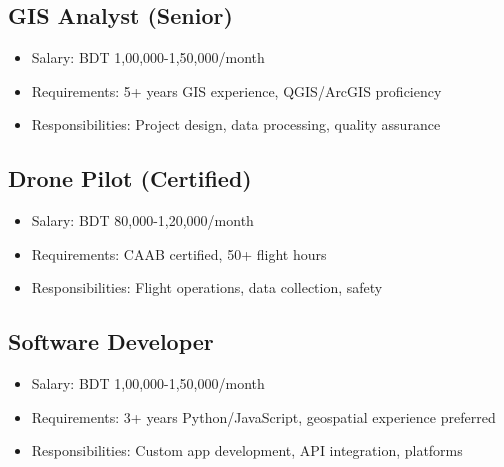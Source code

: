 \subsection*{GIS Analyst (Senior)}

\begin{itemize}
    \item Salary: BDT 1,00,000-1,50,000/month
    \item Requirements: 5+ years GIS experience, QGIS/ArcGIS proficiency
    \item Responsibilities: Project design, data processing, quality assurance
\end{itemize}

\subsection*{Drone Pilot (Certified)}

\begin{itemize}
    \item Salary: BDT 80,000-1,20,000/month
    \item Requirements: CAAB certified, 50+ flight hours
    \item Responsibilities: Flight operations, data collection, safety
\end{itemize}

\subsection*{Software Developer}

\begin{itemize}
    \item Salary: BDT 1,00,000-1,50,000/month
    \item Requirements: 3+ years Python/JavaScript, geospatial experience preferred
    \item Responsibilities: Custom app development, API integration, platforms
\end{itemize}

